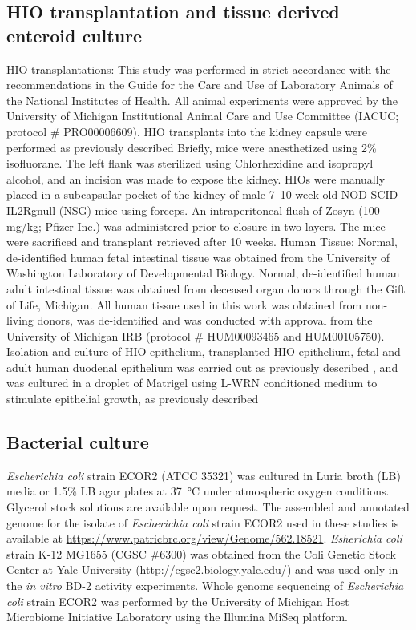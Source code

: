 \documentclass[9pt,lineo]{elife}
\begin{document}
\subsection*{{\bfseries\sffamily } HIO transplantation and tissue derived enteroid culture}
\label{sec:orgheadline15}
HIO transplantations: This study was performed in strict accordance with the recommendations in the Guide for the Care and Use of Laboratory Animals of the National Institutes of Health. All animal experiments were approved by the University of Michigan Institutional Animal Care and Use Committee (IACUC; protocol \# PRO00006609). HIO transplants into the kidney capsule were performed as previously described \citep{Finkbeiner:2015,Dye:2016} Briefly, mice were anesthetized using 2\% isofluorane. The left flank was sterilized using Chlorhexidine and isopropyl alcohol, and an incision was made to expose the kidney. HIOs were manually placed in a subcapsular pocket of the kidney of male 7–10 week old NOD-SCID IL2Rgnull (NSG) mice using forceps. An intraperitoneal flush of Zosyn (100 mg/kg; Pfizer Inc.) was administered prior to closure in two layers. The mice were sacrificed and transplant retrieved after 10 weeks. 
Human Tissue: Normal, de-identified human fetal intestinal tissue was obtained from the University of Washington Laboratory of Developmental Biology. Normal, de-identified human adult intestinal tissue was obtained from deceased organ donors through the Gift of Life, Michigan. All human tissue used in this work was obtained from non-living donors, was de-identified and was conducted with approval from the University of Michigan IRB (protocol \# HUM00093465 and HUM00105750).  Isolation and culture of HIO epithelium, transplanted HIO epithelium, fetal and adult human duodenal epithelium was carried out as previously described \citep{Finkbeiner:2015}, and was cultured in a droplet of Matrigel using L-WRN conditioned medium to stimulate epithelial growth, as previously described \citep{Miyoshi:2012,Miyoshi:2013}
\subsection*{{\bfseries\sffamily } Bacterial culture}
\label{sec:orgheadline16}
\emph{Escherichia coli} strain ECOR2 (ATCC 35321) was cultured in Luria broth (LB) media or 1.5\% LB agar plates at \SI{37}{\celsius} under atmospheric oxygen conditions. Glycerol stock solutions are available upon request. The assembled and annotated genome for the isolate of \emph{Escherichia coli} strain ECOR2 used in these studies is available at \url{https://www.patricbrc.org/view/Genome/562.18521}. \emph{Esherichia coli} strain K-12 MG1655 (CGSC \#6300) was obtained from the Coli Genetic Stock Center at Yale University (\url{http://cgsc2.biology.yale.edu/}) and was used only in the \emph{in vitro} BD-2 activity experiments. Whole genome sequencing of \emph{Escherichia coli} strain ECOR2 was performed by the University of Michigan Host Microbiome Initiative Laboratory using the Illumina MiSeq platform.
\end{document}
